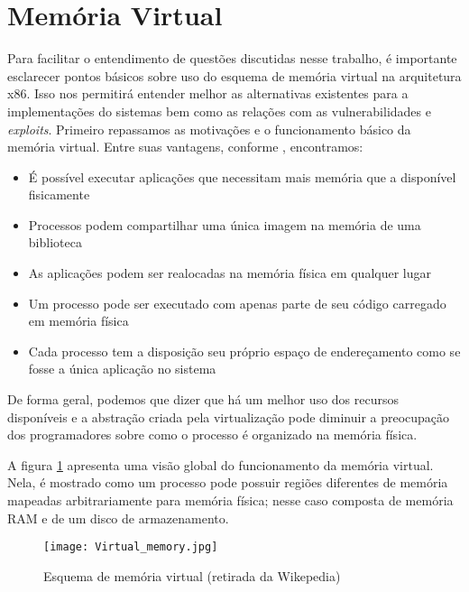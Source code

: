 	\section{Memória Virtual}
		Para facilitar o entendimento de questões discutidas nesse trabalho, é importante esclarecer
		pontos básicos sobre uso do esquema de memória virtual na arquitetura x86.
		Isso nos permitirá entender melhor as alternativas existentes para a implementações
		do sistemas bem como as relações com as vulnerabilidades e \textsl{exploits}.
		Primeiro repassamos as motivações e o funcionamento básico da memória virtual.
		Entre suas vantagens, conforme \cite{Bovet2005}, encontramos:
		\begin{itemize}
			\item{É possível executar aplicações que necessitam mais memória que a disponível fisicamente}
			\item{Processos podem compartilhar uma única imagem na memória de uma biblioteca}
			\item{As aplicações podem ser realocadas na memória física em qualquer lugar}
			\item{Um processo pode ser executado com apenas parte de seu código carregado em memória física}
			\item{Cada processo tem a disposição seu próprio espaço de endereçamento como se fosse
			a única aplicação no sistema} 
		\end{itemize}
		De forma geral, podemos que dizer que há um melhor uso dos recursos disponíveis e a abstração
		criada pela virtualização pode diminuir a preocupação dos programadores sobre
		como o processo é organizado na memória física.

		
		A figura \ref{fig:memoria_virtual} apresenta uma visão global do funcionamento da memória virtual.
		Nela, é mostrado como um processo pode possuir regiões diferentes de memória mapeadas
		arbitrariamente para memória física; nesse caso composta de memória RAM e de um disco de armazenamento.
		\begin{figure}
			\begin{center}
				\texttt{[image: Virtual\_memory.jpg]}
				\caption{Esquema de memória virtual (retirada da Wikepedia)}
				\label{fig:memoria_virtual}
			\end{center}
		\end{figure}
		

